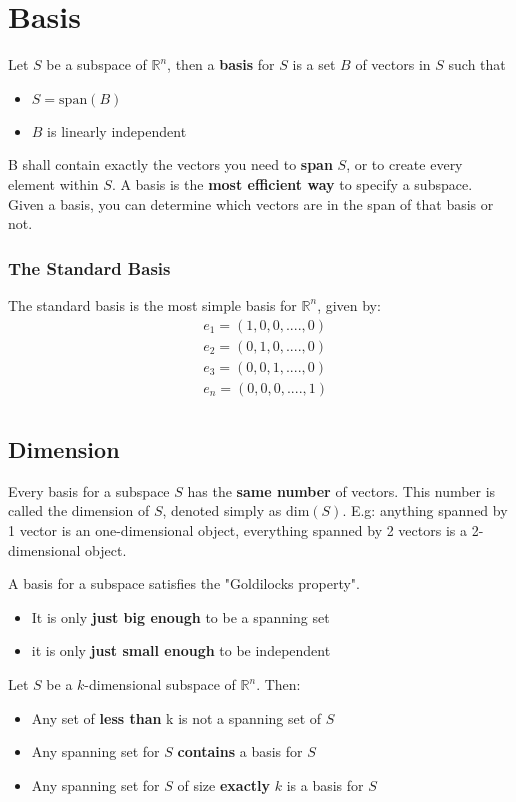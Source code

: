 \documentclass[11pt]{book}
\begin{document}
{{\section{Basis}
\par{Let $S$ be a subspace of $\mathbb{R}^{n}$, then a \textbf{basis} for $S$ is a set $B$ of vectors in $S$ such that 
\begin{itemize}
	\item{$S=\mathrm{span}\left(B\right)$}
	\item{$B$ is linearly independent}
\end{itemize}
B shall contain exactly the vectors you need to \textbf{span} $S$, or to create every element within $S$. A basis is the \textbf{most efficient way} to specify a subspace. Given a basis, you can determine which vectors are in the span of that basis or not. }
\subsubsection{The Standard Basis}
\par{The standard basis is the most simple basis for $\mathbb{R}^{n}$, given by:}
\begin{align*}
	& e_{1}=\left(1,0,0,....,0\right) \\
	& e_{2}=\left(0,1,0,....,0\right) \\
	& e_{3}=\left(0,0,1,....,0\right) \\
	& e_{n}=\left(0,0,0,....,1\right) \\
\end{align*}
\subsection{Dimension}
\par{Every basis for a subspace $S$ has the  \textbf{same number} of vectors. This number is called the dimension of $S$, denoted simply as  $\mathrm{dim}\left(S\right)$. E.g: anything spanned by 1 vector is an one-dimensional object, everything spanned by 2 vectors is a 2-dimensional object.

A basis for a subspace satisfies the "Goldilocks property".
\begin{itemize}
	\item{It is only \textbf{just big enough} to be a spanning set}
	\item{it is only \textbf{just small enough} to be independent}
\end{itemize}
Let $S$ be a $k$-dimensional subspace of $\mathbb{R}^{n}$. Then:
\begin{itemize}
	\item{Any set of \textbf{less than} k is not a spanning set of $S$}
	\item{Any spanning set for $S$  \textbf{contains} a basis for $S$}
	\item{Any spanning set for $S$ of size \textbf{exactly} $k$ is a basis for $S$}
\end{itemize}
}
}}
\end{document}
